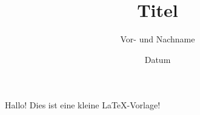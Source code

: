 \documentclass[a4paper,ngerman]{scrartcl} %
\author{Vor- und Nachname}
\title{Titel}
\date{Datum}
\begin{document}
\maketitle

Hallo! Dies ist eine kleine {\LaTeX}-Vorlage!
\end{document}
